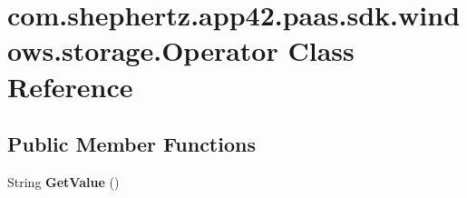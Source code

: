 \hypertarget{classcom_1_1shephertz_1_1app42_1_1paas_1_1sdk_1_1windows_1_1storage_1_1_operator}{\section{com.\+shephertz.\+app42.\+paas.\+sdk.\+windows.\+storage.\+Operator Class Reference}
\label{classcom_1_1shephertz_1_1app42_1_1paas_1_1sdk_1_1windows_1_1storage_1_1_operator}
}
\subsection*{Public Member Functions}
\begin{DoxyCompactItemize}
\item 
\hypertarget{classcom_1_1shephertz_1_1app42_1_1paas_1_1sdk_1_1windows_1_1storage_1_1_operator_a8e1d3398cbcb4a8a9a8a509914fc4937}{String {\bfseries Get\+Value} ()}\label{classcom_1_1shephertz_1_1app42_1_1paas_1_1sdk_1_1windows_1_1storage_1_1_operator_a8e1d3398cbcb4a8a9a8a509914fc4937}

\end{DoxyCompactItemize}
